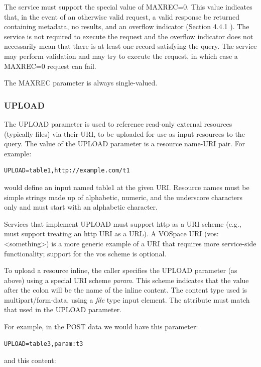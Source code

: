 \documentclass[11pt,letter]{ivoa}
\begin{document}
The service must support the special value of MAXREC=0. This value indicates 
that, in the event of an otherwise valid request, a valid response be returned 
containing metadata, no results, and an overflow indicator (Section 4.4.1 ). The 
service is not required to execute the request and the overflow indicator does 
not necessarily mean that there is at least one record satisfying the query. The 
service may perform validation and may try to execute the request, in which case 
a MAXREC=0 request can fail.

The MAXREC parameter is always single-valued.

\subsubsection{UPLOAD}
\label{sec:UPLOAD}
The UPLOAD parameter is used to reference read-only external resources 
(typically files) via their URI, to be uploaded for use as input resources to 
the query. The value of the UPLOAD parameter is a resource name-URI pair. For 
example:

\begin{verbatim}
UPLOAD=table1,http://example.com/t1
\end{verbatim}

would define an input named table1 at the given URI. Resource names must be 
simple strings made up of alphabetic, numeric, and the underscore characters 
only and must start with an alphabetic character.

Services that implement UPLOAD must support http as a URI scheme (e.g., must 
support treating an http URI as a URL). A VOSpace URI (vos:<something>)  is a 
more generic example of a URI that requires more service-side functionality; 
support for the vos scheme is optional.

To upload a resource inline, the caller specifies the UPLOAD parameter (as 
above) using a special URI scheme \emph{param}. This scheme indicates that the value 
after the colon will be the name of the inline content. The content type used is 
multipart/form-data, using a \emph{file} type input element. The  attribute 
must match that used in the UPLOAD parameter.

For example, in the POST data we would have this parameter:

\begin{verbatim}
UPLOAD=table3,param:t3
\end{verbatim}

and this content:
\end{document}
